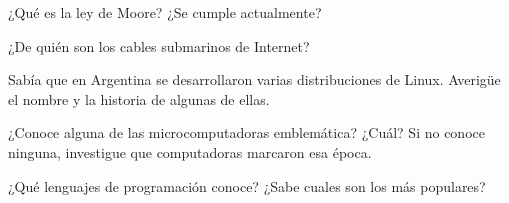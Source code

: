 \begin{exercise}
¿Qué es la ley de Moore? ¿Se cumple actualmente?
\end{exercise}

\begin{exercise}
¿De quién son los cables submarinos de Internet?
\end{exercise}

\begin{exercise}
Sabía que en Argentina se desarrollaron varias distribuciones de Linux. Averigüe
el nombre y la historia de algunas de ellas.
\end{exercise}

\begin{exercise}
¿Conoce alguna de las microcomputadoras emblemática? ¿Cuál? Si no conoce
ninguna, investigue que computadoras marcaron esa época.
\end{exercise}

\begin{exercise}
¿Qué lenguajes de programación conoce? ¿Sabe cuales son los más populares?
\end{exercise}










